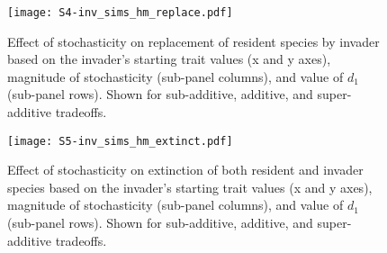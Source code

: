 \begin{figure}[ht!]
\centering
\texttt{[image: S4-inv\_sims\_hm\_replace.pdf]}
\caption{Effect of stochasticity on replacement of resident species by invader
    based on the invader's starting trait values (x and y axes),
    magnitude of stochasticity (sub-panel columns), and 
    value of $d_1$ (sub-panel rows).
    Shown for sub-additive, additive, and super-additive tradeoffs.}
\label{fig:inv-sims-heatmap-replace}
\end{figure}

\begin{figure}[ht!]
\centering
\texttt{[image: S5-inv\_sims\_hm\_extinct.pdf]}
\caption{Effect of stochasticity on extinction of both resident and invader
    species based on the invader's starting trait values (x and y axes),
    magnitude of stochasticity (sub-panel columns), and 
    value of $d_1$ (sub-panel rows).
    Shown for sub-additive, additive, and super-additive tradeoffs.}
\label{fig:inv-sims-heatmap-extinct}
\end{figure}

